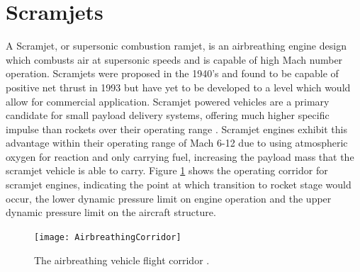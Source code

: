 \section{Scramjets}


A Scramjet, or supersonic combustion ramjet, is an airbreathing engine design which combusts air at supersonic speeds and is capable of high Mach number operation. Scramjets were proposed in the 1940's \cite{Curran2001} and found to be capable of positive net thrust in 1993 \cite{Paull1993} but have yet to be developed to a level which would allow for commercial application. Scramjet powered vehicles are a primary candidate for small payload delivery systems, offering much higher specific impulse than rockets over their operating range \cite{Billig1993} \cite{Cook2003}. Scramjet engines exhibit this advantage within their operating range of Mach 6-12 due to using atmospheric oxygen for reaction and only carrying fuel, increasing the payload mass that the scramjet vehicle is able to carry. Figure \ref{fig:AirbreathingCorridor} shows the operating corridor for scramjet engines, indicating the point at which transition to rocket stage would occur, the lower dynamic pressure limit on engine operation and the upper dynamic pressure limit on the aircraft structure.
\begin{figure}[ht]
	\centering
	\texttt{[image: AirbreathingCorridor]}
	\caption{The airbreathing vehicle flight corridor \cite{Smart2010}.}
	\label{fig:AirbreathingCorridor}
\end{figure}

